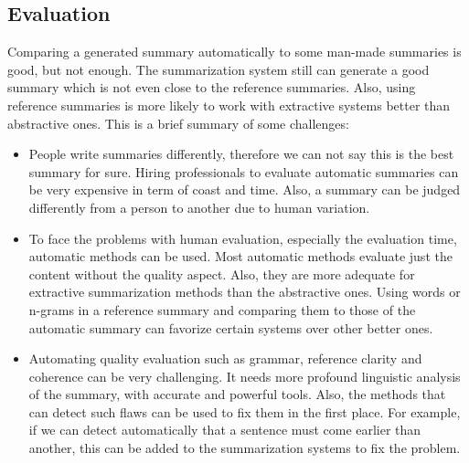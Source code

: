 \subsection{Evaluation}

Comparing a generated summary automatically to some man-made summaries is good, but not enough. 
The summarization system still can generate a good summary which is not even close to the reference summaries. 
Also, using reference summaries is more likely to work with extractive systems better than abstractive ones. 
This is a brief summary of some challenges:
\begin{itemize}
	\item People write summaries differently, therefore we can not say this is the best summary for sure. 
	Hiring professionals to evaluate automatic summaries can be very expensive in term of coast and time. 
	Also, a summary can be judged differently from a person to another due to human variation.
	
	\item To face the problems with human evaluation, especially the evaluation time, automatic methods can be used. 
	Most automatic methods evaluate just the content without the quality aspect. 
	Also, they are more adequate for extractive summarization methods than the abstractive ones. 
	Using words or n-grams in a reference summary and comparing them to those of the automatic summary can favorize certain systems over other better ones. 
	
	\item Automating quality evaluation such as grammar, reference clarity and coherence can be very challenging. 
	It needs more profound linguistic analysis of the summary, with accurate and powerful tools.
	Also, the methods that can detect such flaws can be used to fix them in the first place.
	For example, if we can detect automatically that a sentence must come earlier than another, this can be added to the summarization systems to fix the problem.
	
\end{itemize}



